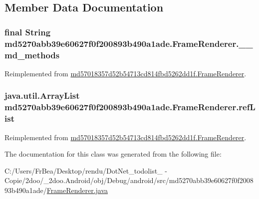 \subsection{Member Data Documentation}
\hypertarget{classmd5270abb39e60627f0f200893b490a1ade_1_1_frame_renderer_c9ef5c3ae0c3ecaad8abeb4649d6a402}{
\subsubsection[{\_\-\_\-md\_\-methods}]{\setlength{\rightskip}{0pt plus 5cm}final String {\bf md5270abb39e60627f0f200893b490a1ade.FrameRenderer.\_\-\_\-md\_\-methods}}}
\label{classmd5270abb39e60627f0f200893b490a1ade_1_1_frame_renderer_c9ef5c3ae0c3ecaad8abeb4649d6a402}




Reimplemented from \hyperlink{classmd57018357d52b54713cd814fbd5262dd1f_1_1_frame_renderer_166d3c4d9a96ccf8eb5ff4a0bf70b76f}{md57018357d52b54713cd814fbd5262dd1f.FrameRenderer}.\hypertarget{classmd5270abb39e60627f0f200893b490a1ade_1_1_frame_renderer_5ed9d00ee3a9f50c03b3bde2a352e936}{
\subsubsection[{refList}]{\setlength{\rightskip}{0pt plus 5cm}java.util.ArrayList {\bf md5270abb39e60627f0f200893b490a1ade.FrameRenderer.refList}}}
\label{classmd5270abb39e60627f0f200893b490a1ade_1_1_frame_renderer_5ed9d00ee3a9f50c03b3bde2a352e936}




Reimplemented from \hyperlink{classmd57018357d52b54713cd814fbd5262dd1f_1_1_frame_renderer_f8ecb51614566d34e3a28877de382591}{md57018357d52b54713cd814fbd5262dd1f.FrameRenderer}.

The documentation for this class was generated from the following file:\begin{CompactItemize}
\item 
C:/Users/FrBea/Desktop/rendu/DotNet\_\-todolist\_ - Copie/2doo/\_\-2doo.Android/obj/Debug/android/src/md5270abb39e60627f0f200893b490a1ade/\hyperlink{md5270abb39e60627f0f200893b490a1ade_2_frame_renderer_8java}{FrameRenderer.java}\end{CompactItemize}
